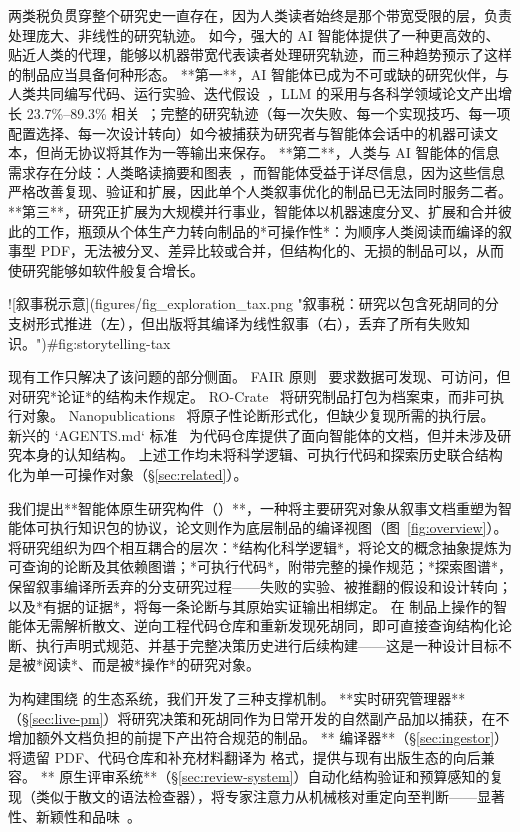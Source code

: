 \begin{markdown}
两类税负贯穿整个研究史一直存在，因为人类读者始终是那个带宽受限的层，负责处理庞大、非线性的研究轨迹。
如今，强大的 AI 智能体提供了一种更高效的、贴近人类的代理，能够以机器带宽代表读者处理研究轨迹，而三种趋势预示了这样的制品应当具备何种形态。
**第一**，AI 智能体已成为不可或缺的研究伙伴，与人类共同编写代码、运行实验、迭代假设~\citep{lu2024aiscientist}，LLM 的采用与各科学领域论文产出增长 23.7\%--89.3\% 相关~\citep{kusumegi2025scientific}；完整的研究轨迹（每一次失败、每一个实现技巧、每一项配置选择、每一次设计转向）如今被捕获为研究者与智能体会话中的机器可读文本，但尚无协议将其作为一等输出来保存。
**第二**，人类与 AI 智能体的信息需求存在分歧：人类略读摘要和图表~\citep{renear2009strategic}，而智能体受益于详尽信息，因为这些信息严格改善复现、验证和扩展，因此单个人类叙事优化的制品已无法同时服务二者。
**第三**，研究正扩展为大规模并行事业，智能体以机器速度分叉、扩展和合并彼此的工作，瓶颈从个体生产力转向制品的*可操作性*：为顺序人类阅读而编译的叙事型 PDF，无法被分叉、差异比较或合并，但结构化的、无损的制品可以，从而使研究能够如软件般复合增长。

![叙事税示意](figures/fig_exploration_tax.png "叙事税：研究以包含死胡同的分支树形式推进（左），但出版将其编译为线性叙事（右），丢弃了所有失败知识。"){#fig:storytelling-tax}

现有工作只解决了该问题的部分侧面。
FAIR 原则~\citep{wilkinson2016fair} 要求数据可发现、可访问，但对研究*论证*的结构未作规定。
RO-Crate~\citep{soilandreyes2022rocrate} 将研究制品打包为档案束，而非可执行对象。
Nanopublications~\citep{groth2010nanopub} 将原子性论断形式化，但缺少复现所需的执行层。
新兴的 `AGENTS.md` 标准~\citep{openai2025agentsmd} 为代码仓库提供了面向智能体的文档，但并未涉及研究本身的认知结构。
上述工作均未将科学逻辑、可执行代码和探索历史联合结构化为单一可操作对象（\S\ref{sec:related}）。

我们提出**智能体原生研究构件（\ara{}）**，一种将主要研究对象从叙事文档重塑为智能体可执行知识包的协议，论文则作为底层制品的编译视图（图~\ref{fig:overview}）。
\ara{} 将研究组织为四个相互耦合的层次：*结构化科学逻辑*，将论文的概念抽象提炼为可查询的论断及其依赖图谱；*可执行代码*，附带完整的操作规范；*探索图谱*，保留叙事编译所丢弃的分支研究过程——失败的实验、被推翻的假设和设计转向；以及*有据的证据*，将每一条论断与其原始实证输出相绑定。
在 \ara{} 制品上操作的智能体无需解析散文、逆向工程代码仓库和重新发现死胡同，即可直接查询结构化论断、执行声明式规范、并基于完整决策历史进行后续构建——这是一种设计目标不是被*阅读*、而是被*操作*的研究对象。

为构建围绕 \ara{} 的生态系统，我们开发了三种支撑机制。
**实时研究管理器**（\S\ref{sec:live-pm}）将研究决策和死胡同作为日常开发的自然副产品加以捕获，在不增加额外文档负担的前提下产出符合规范的制品。
**\ara{} 编译器**（\S\ref{sec:ingestor}）将遗留 PDF、代码仓库和补充材料翻译为 \ara{} 格式，提供与现有出版生态的向后兼容。
**\ara{} 原生评审系统**（\S\ref{sec:review-system}）自动化结构验证和预算感知的复现（类似于散文的语法检查器），将专家注意力从机械核对重定向至判断——显著性、新颖性和品味~\citep{aczel2021billiondollar}。


\end{markdown}
